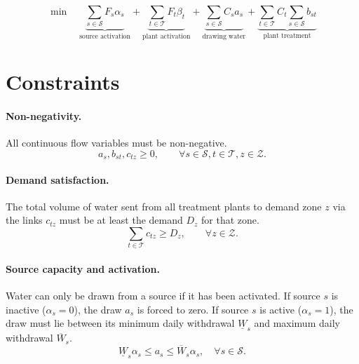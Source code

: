 \documentclass[10pt]{article}
\begin{document}
\begin{equation}
    \min \quad
    \underbrace{\sum_{s \in \mathcal{S}} F_s \alpha_s}_{\text{source activation}}
    + \underbrace{\sum_{t \in \mathcal{T}} F_t \beta_t}_{\text{plant activation}}
    + \underbrace{\sum_{s \in \mathcal{S}} C_s a_s}_{\text{drawing water}}
    + \underbrace{\sum_{t \in \mathcal{T}} C_t \sum_{s \in \mathcal{S}} b_{st}}_{\text{plant treatment}}
\end{equation}

\section{Constraints}

\paragraph{Non-negativity.} All continuous flow variables must be non-negative.
\begin{equation}
    a_s, b_{st}, c_{tz} \ge 0, \qquad \forall s \in \mathcal{S}, t \in \mathcal{T}, z \in \mathcal{Z}.
\end{equation}

\paragraph{Demand satisfaction.} The total volume of water sent from all treatment plants to demand zone $z$ via the links $c_{tz}$ must be at least the demand $D_z$ for that zone.
\begin{equation}
    \sum_{t \in \mathcal{T}} c_{tz} \ge D_z, \qquad \forall z \in \mathcal{Z}.
\end{equation}

\paragraph{Source capacity and activation.} Water can only be drawn from a source
if it has been activated. If source $s$ is inactive ($\alpha_s = 0$), the draw
$a_s$ is forced to zero. If source $s$ is active ($\alpha_s = 1$), the draw must
lie between its minimum daily withdrawal $\underline{W}_s$ and maximum daily
withdrawal $\overline{W}_s$.
\begin{equation}\label{eq:source_capacity}
    \underline{W}_s\alpha_s
    \leq
    a_s
    \leq
    \overline{W}_s\alpha_s,
    \quad \forall s \in \mathcal{S}.
\end{equation}
\end{document}

